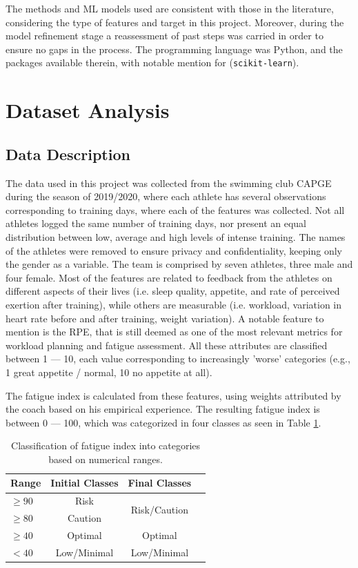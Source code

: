 \documentclass[conference]{IEEEtran}
\begin{document}

The methods and ML models used are consistent with those in the literature, considering the type of features and target in this project. Moreover, during the model refinement stage a reassessment of past steps was carried in order to ensure no gaps in the process. The programming language was Python, and the packages available therein, with notable mention for (\texttt{scikit-learn}).

\section{Dataset Analysis}

\subsection{Data Description}

The data used in this project was collected from the swimming club CAPGE during the season of 2019/2020, where each athlete has several observations corresponding to training days, where each of the features was collected. Not all athletes logged the same number of training days, nor present an equal distribution between low, average and high levels of intense training. The names of the athletes were removed to ensure privacy and confidentiality, keeping only the gender as a variable. The team is comprised by seven athletes, three male and four female. Most of the features are related to feedback from the athletes on different aspects of their lives (i.e. sleep quality, appetite, and rate of perceived exertion after training), while others are measurable (i.e. workload, variation in heart rate before and after training, weight variation). A notable feature to mention is the RPE, that is still deemed as one of the most relevant metrics for workload planning and fatigue assessment. All these attributes are classified between 1 — 10, each value corresponding to increasingly 'worse' categories (e.g., 1 great appetite / normal, 10 no appetite at all).

The fatigue index is calculated from these features, using weights attributed by the coach based on his empirical experience. The resulting fatigue index is between 0 — 100, which was categorized in four classes as seen in Table \ref{classTable}. 


\begin{table}[H]
\centering
\caption{Classification of fatigue index into categories based on numerical ranges.}
\label{classTable}
\begin{tabular}{lccc}
\toprule
\textbf{Range} & \textbf{Initial Classes} & \textbf{Final Classes} \\
\midrule
$\geq  90$ & Risk & \multirow{2}{*}{Risk/Caution} \\
$\geq  80$ & Caution & \\
$\geq 40$ & Optimal & Optimal \\
$< 40$ & Low/Minimal & Low/Minimal \\
\bottomrule
\end{tabular}
\end{table}
\end{document}
